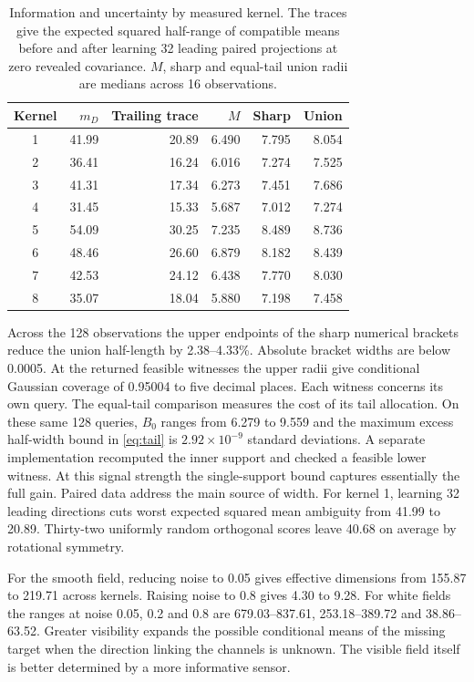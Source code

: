 \begin{table}[ht]
\centering
\caption{Information and uncertainty by measured kernel. The traces give the expected squared half-range of compatible means before and after learning 32 leading paired projections at zero revealed covariance. $M$, sharp and equal-tail union radii are medians across 16 observations.}
\begin{tabular}{crrrrr}
\toprule
Kernel & $m_D$ & Trailing trace & $M$ & Sharp & Union \\
\midrule
1 &41.99&20.89&6.490&7.795&8.054\\
2 &36.41&16.24&6.016&7.274&7.525\\
3 &41.31&17.34&6.273&7.451&7.686\\
4 &31.45&15.33&5.687&7.012&7.274\\
5 &54.09&30.25&7.235&8.489&8.736\\
6 &48.46&26.60&6.879&8.182&8.439\\
7 &42.53&24.12&6.438&7.770&8.030\\
8 &35.07&18.04&5.880&7.198&7.458\\
\bottomrule
\end{tabular}\label{tab:kernels}
\end{table}
Across the 128 observations the upper endpoints of the sharp numerical brackets reduce the union half-length by 2.38--4.33\%. Absolute bracket widths are below 0.0005. At the returned feasible witnesses the upper radii give conditional Gaussian coverage of 0.95004 to five decimal places. Each witness concerns its own query. The equal-tail comparison measures the cost of its tail allocation. On these same 128 queries, $B_0$ ranges from 6.279 to 9.559 and the maximum excess half-width bound in \eqref{eq:tail} is $2.92\times10^{-9}$ standard deviations. A separate implementation recomputed the inner support and checked a feasible lower witness. At this signal strength the single-support bound captures essentially the full gain. Paired data address the main source of width. For kernel 1, learning 32 leading directions cuts worst expected squared mean ambiguity from 41.99 to 20.89. Thirty-two uniformly random orthogonal scores leave 40.68 on average by rotational symmetry.

For the smooth field, reducing noise to 0.05 gives effective dimensions from 155.87 to 219.71 across kernels. Raising noise to 0.8 gives 4.30 to 9.28. For white fields the ranges at noise 0.05, 0.2 and 0.8 are 679.03--837.61, 253.18--389.72 and 38.86--63.52. Greater visibility expands the possible conditional means of the missing target when the direction linking the channels is unknown. The visible field itself is better determined by a more informative sensor.

